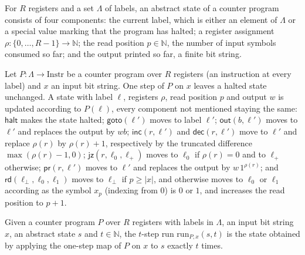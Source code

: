 \begin{definition}
\label{Complexity.CounterProg.St}
\leanok
For $R$ registers and a set $\Lambda$ of labels, an abstract state of a counter program consists
of four components: the current label, which is either an element of $\Lambda$ or a special value
marking that the program has halted; a register assignment $\rho : \{0, \dots, R-1\} \to
\mathbb{N}$; the read position $p \in \mathbb{N}$, the number of input symbols consumed so far;
and the output printed so far, a finite bit string.
\end{definition}

\begin{definition}
\label{Complexity.CounterProg.step}
\leanok
{}
Let $P : \Lambda \to \mathrm{Instr}$ be a counter program over $R$ registers (an instruction at
every label) and $x$ an input bit string. One step of $P$ on $x$ leaves a halted state unchanged.
A state with label $\ell$, registers $\rho$, read position $p$ and output $w$ is updated according
to $P(\ell)$, every component not mentioned staying the same:
$\mathsf{halt}$ makes the state halted; $\mathsf{goto}(\ell')$ moves to label $\ell'$;
$\mathsf{out}(b, \ell')$ moves to $\ell'$ and replaces the output by $w b$;
$\mathsf{inc}(r, \ell')$ and $\mathsf{dec}(r, \ell')$ move to $\ell'$ and replace $\rho(r)$ by
$\rho(r) + 1$, respectively by the truncated difference $\max(\rho(r) - 1, 0)$;
$\mathsf{jz}(r, \ell_0, \ell_+)$ moves to $\ell_0$ if $\rho(r) = 0$ and to $\ell_+$ otherwise;
$\mathsf{pr}(r, \ell')$ moves to $\ell'$ and replaces the output by $w\,1^{\rho(r)}$; and
$\mathsf{rd}(\ell_\bot, \ell_0, \ell_1)$ moves to $\ell_\bot$ if $p \ge |x|$, and otherwise moves
to $\ell_0$ or $\ell_1$ according as the symbol $x_p$ (indexing from $0$) is $0$ or $1$, and
increases the read position to $p + 1$.
\end{definition}

\begin{definition}
\label{Complexity.CounterProg.run}
\leanok
{}
Given a counter program $P$ over $R$ registers with labels in $\Lambda$, an input bit string $x$,
an abstract state $s$ and $t \in \mathbb{N}$, the $t$-step run $\mathrm{run}_{P,x}(s, t)$ is the
state obtained by applying the one-step map of $P$ on $x$ to $s$ exactly $t$ times.
\end{definition}

